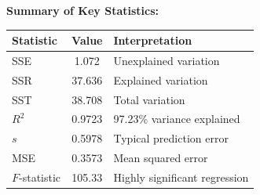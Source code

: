 \documentclass[12pt]{article}
\begin{document}
\begin{solution}
\textbf{Summary of Key Statistics:}

\begin{center}
\begin{tabular}{|l|c|l|}
\hline
\textbf{Statistic} & \textbf{Value} & \textbf{Interpretation} \\
\hline
SSE & 1.072 & Unexplained variation \\
SSR & 37.636 & Explained variation \\
SST & 38.708 & Total variation \\
$R^2$ & 0.9723 & 97.23\% variance explained \\
$s$ & 0.5978 & Typical prediction error \\
MSE & 0.3573 & Mean squared error \\
$F$-statistic & 105.33 & Highly significant regression \\
\hline
\end{tabular}
\end{center}
\end{solution}
\end{document}
